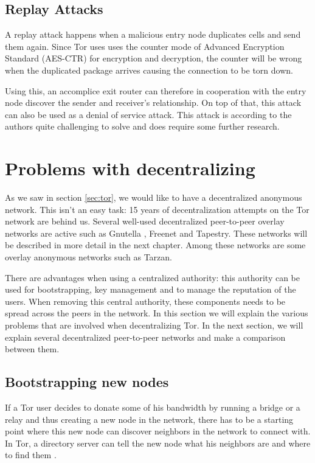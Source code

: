 \documentclass{article}
\begin{document}
	\subsection{Replay Attacks}
		A replay attack \cite{pries2008new} happens when a malicious entry node duplicates cells and send them again. Since Tor uses uses the counter mode of Advanced Encryption Standard (AES-CTR) for encryption and decryption, the counter will be wrong when the duplicated package arrives causing the connection to be torn down.
			
		Using this, an accomplice exit router can therefore in cooperation with the entry node discover the sender and receiver's relationship. On top of that, this attack can also be used as a denial of service attack. This attack is according to the authors quite challenging to solve and does require some further research.

\section{Problems with decentralizing}
	\label{sec:problems}

	As we saw in section \ref{sec:tor}, we would like to have a decentralized anonymous network. This isn't an easy task: 15 years of decentralization attempts on the Tor network are behind us. Several well-used decentralized peer-to-peer overlay networks are active such as Gnutella \cite{ripeanu2001peer}, Freenet \cite{lua2005survey} and Tapestry. These networks will be described in more detail in the next chapter. Among these networks are some overlay anonymous networks such as Tarzan.

	There are advantages when using a centralized authority: this authority can be used for bootstrapping, key management and to manage the reputation of the users. When removing this central authority, these components needs to be spread across the peers in the network. In this section we will explain the various problems that are involved when decentralizing Tor. In the next section, we will explain several decentralized peer-to-peer networks and make a comparison between them.

	\subsection{Bootstrapping new nodes}
		If a Tor user decides to donate some of his bandwidth by running a bridge or a relay and thus creating a new node in the network, there has to be a starting point where this new node can discover neighbors in the network to connect with. In Tor, a directory server can tell the new node what his neighbors are and where to find them \cite{dingledine2004tor}.
		
\end{document}
